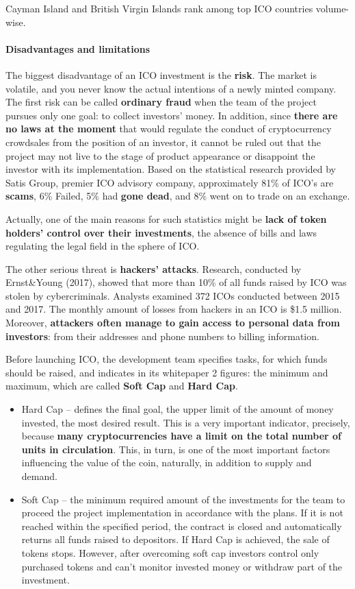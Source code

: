 Cayman Island and British Virgin Islands rank among top ICO countries volume-wise.

\paragraph{Disadvantages and limitations}
The biggest disadvantage of an ICO investment is the \textbf{risk}. The market is volatile, and you never know the actual intentions of a newly minted company. The first risk can be called \textbf{ordinary fraud} when the team of the project pursues only one goal: to collect investors' money.
In addition, since \textbf{there are no laws at the moment} that would regulate the conduct of cryptocurrency crowdsales from the position of an investor, it cannot be ruled out that the project may not live to the stage of product appearance or disappoint the investor with its implementation.
Based on the statistical research provided by Satis Group, premier ICO advisory company, approximately 81\% of ICO's are \textbf{scams}, 6\% Failed, 5\% had \textbf{gone dead}, and 8\% went on to trade on an exchange.

Actually, one of the main reasons for such statistics might be \textbf{lack of token holders' control over their investments}, the absence of bills and laws regulating the legal field in the sphere of ICO.

The other serious threat is \textbf{hackers' attacks}. Research, conducted by Ernst\&Young (2017), showed that more than 10\% of all funds raised by ICO was stolen by cybercriminals. Analysts examined 372 ICOs conducted between 2015 and 2017. The monthly amount of losses from hackers in an ICO is \$1.5 million. Moreover, \textbf{attackers often manage to gain access to personal data from investors}: from their addresses and phone numbers to billing information.

Before launching ICO, the development team specifies tasks, for which funds should be raised, and indicates in its whitepaper 2 figures: the minimum and maximum, which are called \textbf{Soft Cap} and \textbf{Hard Cap}.

\begin{itemize}
	\item Hard Cap -- defines the final goal, the upper limit of the amount of money invested, the most desired result. This is a very important indicator, precisely, because \textbf{many cryptocurrencies have a limit on the total number of units in circulation}. This, in turn, is one of the most important factors influencing the value of the coin, naturally, in addition to supply and demand.
	\item Soft Cap -- the minimum required amount of the investments for the team to proceed the project implementation in accordance with the plans. If it is not reached within the specified period, the contract is closed and automatically returns all funds raised to depositors. If Hard Cap is achieved, the sale of tokens stops. However, after overcoming soft cap investors control only purchased tokens and can't monitor invested money or withdraw part of the investment.
\end{itemize}

